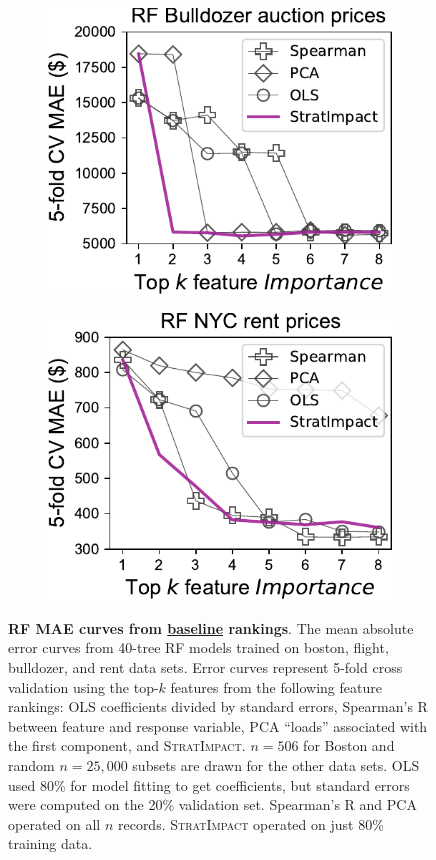 \documentclass[11pt]{article}
\newcommand{\simp}{\fontfamily{cmr}\textsc{\small StratImpact}}
\begin{document}
\begin{figure}
\begin{subfigure}{.245\textwidth}
\subcaption{}
\end{subfigure}
\begin{subfigure}{.245\textwidth}
    \centering
\includegraphics[scale=0.45]{images/bulldozer-topk-baseline-Importance.pdf}
\subcaption{}
\end{subfigure}
\begin{subfigure}{.245\textwidth}
    \centering
\includegraphics[scale=0.45]{images/rent-topk-baseline-Importance.pdf}
\subcaption{}
\end{subfigure} 
\caption{\small {\bf RF MAE curves from \underline{baseline} rankings}. The mean absolute error curves from 40-tree RF models trained on boston, flight, bulldozer, and rent data sets. Error curves represent 5-fold cross validation using the top-$k$ features from the following feature rankings: OLS coefficients divided by standard errors, Spearman's R between feature and response variable, PCA ``loads'' associated with the first component, and \simp{}. $n=506$ for Boston and random $n=25,000$ subsets are drawn for the other data sets. OLS used 80\% for model fitting to get coefficients, but standard errors were computed on the 20\% validation set.  Spearman's R and PCA operated on all $n$ records. \simp{} operated on just 80\% training data.}

\end{figure}
\end{document}
